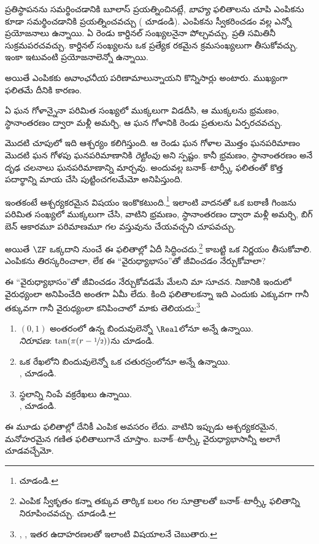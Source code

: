 \documentclass[../../../include/open-logic-section]{subfiles}
\begin{document}

ప్రతిస్థాపనను సమర్థించడానికి బూలాస్ ప్రయత్నించినట్లే, \emph{బాహ్య} ఫలితాలను చూపి ఎంపికను కూడా సమర్థించడానికి ప్రయత్నించవచ్చు ( చూడండి). ఎంపికను స్వీకరించడం వల్ల ఎన్నో ప్రయోజనాలు ఉన్నాయి. ఏ రెండు కార్డినల్ సంఖ్యలనైనా పోల్చవచ్చు. ప్రతి సమితినీ సుక్రమపరచవచ్చు.
కార్డినల్ సంఖ్యలను ఒక ప్రత్యేక రకమైన క్రమసంఖ్యలుగా తీసుకోవచ్చు.
ఇంకా ఇటువంటి ప్రయోజనాలెన్నో ఉన్నాయి.

అయితే ఎంపికకు \emph{అవాంఛనీయ} పరిణామాలున్నాయని కొన్నిసార్లు అంటారు. ముఖ్యంగా \cite{BanachTarski1924} ఫలితమే దీనికి కారణం.

\begin{thm}[బనాక్--టార్స్కీ వైరుధ్యాభాసం ($\ZFC$లో)]
ఏ ఘన గోళాన్నైనా పరిమిత సంఖ్యలో ముక్కలుగా విడదీసి, ఆ ముక్కలను భ్రమణం, స్థానాంతరణం ద్వారా మళ్లీ అమర్చి, ఆ ఘన గోళానికి రెండు ప్రతులను ఏర్పరచవచ్చు.
\end{thm}
\noindent
మొదటి చూపులో ఇది ఆశ్చర్యం కలిగిస్తుంది. ఆ రెండు ఘన గోళాల
మొత్తం ఘనపరిమాణం మొదటి ఘన గోళపు ఘనపరిమాణానికి
\emph{రెట్టింపు} అని స్పష్టం. కానీ భ్రమణం, స్థానాంతరణం
అనే దృఢ చలనాలు ఘనపరిమాణాన్ని మార్చవు. అందువల్ల
బనాక్--టార్స్కీ ఫలితంతో కొత్త పదార్థాన్ని మాయ చేసి
పుట్టించగలమేమో అనిపిస్తుంది.

ఇంతకంటే ఆశ్చర్యకరమైన విషయం ఇంకొకటుంది.\footnote{\citet[Theorem 3.12]{Wagon2016} చూడండి.} ఇలాంటి వాదనతో ఒక బఠాణీ గింజను పరిమిత సంఖ్యలో ముక్కలుగా చేసి, వాటిని భ్రమణం, స్థానాంతరణం ద్వారా మళ్లీ అమర్చి, బిగ్ బెన్ ఆకారమూ పరిమాణమూ గల వస్తువును చేయవచ్చని చూపవచ్చు.

అయితే $\ZF$ ఒక్కదాని నుంచే ఈ ఫలితాల్లో ఏదీ సిద్ధించదు.\footnote{ఎంపిక స్వీకృతం కన్నా తక్కువ తార్కిక బలం గల సూత్రాలతో బనాక్--టార్స్కీ ఫలితాన్ని నిరూపించవచ్చు. \citet[303]{Wagon2016} చూడండి.} కాబట్టి ఒక నిర్ణయం తీసుకోవాలి. ఎంపికను తిరస్కరించాలా, లేక ఈ ``వైరుధ్యాభాసం''తో జీవించడం నేర్చుకోవాలా?

ఈ ``వైరుధ్యాభాసం''తో జీవించడం నేర్చుకోవడమే మేలని మా
సూచన. నిజానికి ఇందులో వైరుధ్యంలా అనిపించేది అంతగా ఏమీ
లేదు. కింది ఫలితాలకన్నా ఇది ఎందుకు ఎక్కువగా గానీ
తక్కువగా గానీ వైరుధ్యంలా కనిపించాలో మాకు తెలియదు:\footnote{\citet[276--7]{Potter2004}, \citet[16]{Weston2003}, \citet[31, 308--9]{Wagon2016} ఇతర ఉదాహరణలతో ఇలాంటి విషయాలనే చెబుతారు.}
\begin{enumerate}
	\item $(0,1)$ అంతరంలో ఉన్న బిందువులెన్నో $\Real$లోనూ అన్నే ఉన్నాయి.
	\\\emph{నిరూపణ}: $\tan(\pi(r-\nicefrac{1}{2}))$ను చూడండి.
	\item ఒక రేఖలోని బిందువులెన్నో ఒక చతురస్రంలోనూ అన్నే ఉన్నాయి.
	\\,  చూడండి.
	\item స్థలాన్ని నింపే వక్రరేఖలు ఉన్నాయి.
	\\,  చూడండి.
\end{enumerate}
ఈ మూడు ఫలితాల్లో దేనికీ ఎంపిక అవసరం లేదు. వాటిని ఇప్పుడు ఆశ్చర్యకరమైన, మనోహరమైన గణిత ఫలితాలుగానే చూస్తాం. బనాక్--టార్స్కీ వైరుధ్యాభాసాన్నీ అలాగే చూడవచ్చేమో.
\end{document}
